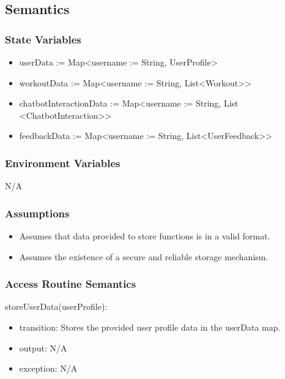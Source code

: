 \documentclass[12pt, titlepage]{article}
\begin{document}
\subsection{Semantics}

\subsubsection{State Variables}
\begin{itemize}
\item userData := Map\textless username := String, UserProfile\textgreater
\item workoutData := Map\textless username := String, List\textless Workout\textgreater\textgreater
\item chatbotInteractionData := Map\textless username := String, List \textless ChatbotInteraction\textgreater\textgreater
\item feedbackData := Map\textless username := String, List\textless UserFeedback\textgreater\textgreater

\end{itemize}

\subsubsection{Environment Variables}
N/A

\subsubsection{Assumptions}
\begin{itemize}
\item Assumes that data provided to store functions is in a valid format.
\item Assumes the existence of a secure and reliable storage mechanism.
\end{itemize}


\subsubsection{Access Routine Semantics}

\noindent storeUserData(userProfile):
\begin{itemize}
\item transition: Stores the provided user profile data in the userData map.
\item output: N/A
\item exception: N/A
\end{itemize}
\end{document}

